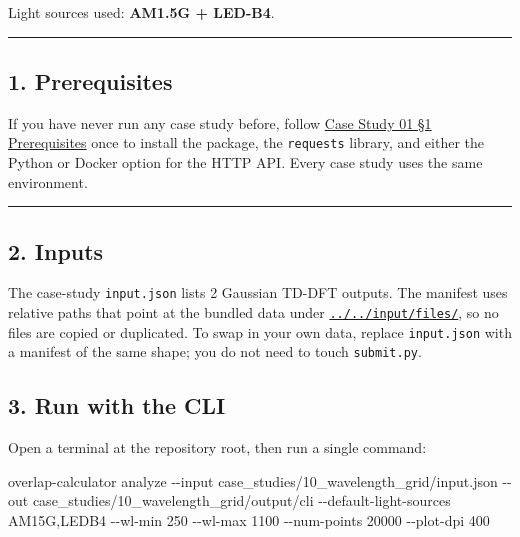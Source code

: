 \documentclass[
  11pt,
]{article}
\newenvironment{Shaded}{}{}
\newcommand{\AttributeTok}[1]{\textcolor[rgb]{0.49,0.56,0.16}{#1}}
\newcommand{\ExtensionTok}[1]{#1}
\newcommand{\NormalTok}[1]{#1}
\begin{document}
Light sources used: \textbf{AM1.5G + LED-B4}.

\begin{center}\rule{0.5\linewidth}{0.5pt}\end{center}

\hypertarget{1-prerequisites}{
\subsection{1. Prerequisites}\label{1-prerequisites}}

If you have never run any case study before, follow
\href{https://github.com/pinarsyt/overlap-calculator/blob/main/case_studies/01_theoretical_only/README.md\#1-prerequisites}{Case
Study 01 §1 Prerequisites} once to install the package, the
\texttt{requests} library, and either the Python or Docker option for
the HTTP API. Every case study uses the same environment.

\begin{center}\rule{0.5\linewidth}{0.5pt}\end{center}

\hypertarget{2-inputs}{
\subsection{2. Inputs}\label{2-inputs}}

The case-study \texttt{input.json} lists 2 Gaussian TD-DFT outputs. The
manifest uses relative paths that point at the bundled data under
\href{https://github.com/pinarsyt/overlap-calculator/blob/main/input/files}{\texttt{../../input/files/}},
so no files are copied or duplicated. To swap in your own data, replace
\texttt{input.json} with a manifest of the same shape; you do not need
to touch \texttt{submit.py}.

\hypertarget{3-run-with-the-cli}{
\subsection{3. Run with the CLI}\label{3-run-with-the-cli}}

Open a terminal at the repository root, then run a single command:

\begin{Shaded}
\begin{Highlighting}[]
\ExtensionTok{overlap{-}calculator}\NormalTok{ analyze }\AttributeTok{{-}{-}input}\NormalTok{ case\_studies/10\_wavelength\_grid/input.json }\AttributeTok{{-}{-}out}\NormalTok{ case\_studies/10\_wavelength\_grid/output/cli }\AttributeTok{{-}{-}default{-}light{-}sources}\NormalTok{ AM15G,LEDB4 }\AttributeTok{{-}{-}wl{-}min}\NormalTok{ 250 }\AttributeTok{{-}{-}wl{-}max}\NormalTok{ 1100 }\AttributeTok{{-}{-}num{-}points}\NormalTok{ 20000 }\AttributeTok{{-}{-}plot{-}dpi}\NormalTok{ 400}
\end{Highlighting}
\end{Shaded}
\end{document}
